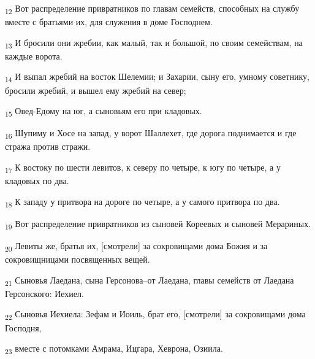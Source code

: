 \begin{tcolorbox}
\textsubscript{12} Вот распределение привратников по главам семейств, способных на службу вместе с братьями их, для служения в доме Господнем.
\end{tcolorbox}
\begin{tcolorbox}
\textsubscript{13} И бросили они жребии, как малый, так и большой, по своим семействам, на каждые ворота.
\end{tcolorbox}
\begin{tcolorbox}
\textsubscript{14} И выпал жребий на восток Шелемии; и Захарии, сыну его, умному советнику, бросили жребий, и вышел ему жребий на север;
\end{tcolorbox}
\begin{tcolorbox}
\textsubscript{15} Овед-Едому на юг, а сыновьям его при кладовых.
\end{tcolorbox}
\begin{tcolorbox}
\textsubscript{16} Шупиму и Хосе на запад, у ворот Шаллехет, где дорога поднимается и где стража против стражи.
\end{tcolorbox}
\begin{tcolorbox}
\textsubscript{17} К востоку по шести левитов, к северу по четыре, к югу по четыре, а у кладовых по два.
\end{tcolorbox}
\begin{tcolorbox}
\textsubscript{18} К западу у притвора на дороге по четыре, а у самого притвора по два.
\end{tcolorbox}
\begin{tcolorbox}
\textsubscript{19} Вот распределение привратников из сыновей Кореевых и сыновей Мерариных.
\end{tcolorbox}
\begin{tcolorbox}
\textsubscript{20} Левиты же, братья их, [смотрели] за сокровищами дома Божия и за сокровищницами посвященных вещей.
\end{tcolorbox}
\begin{tcolorbox}
\textsubscript{21} Сыновья Лаедана, сына Герсонова--от Лаедана, главы семейств от Лаедана Герсонского: Иехиел.
\end{tcolorbox}
\begin{tcolorbox}
\textsubscript{22} Сыновья Иехиела: Зефам и Иоиль, брат его, [смотрели] за сокровищами дома Господня,
\end{tcolorbox}
\begin{tcolorbox}
\textsubscript{23} вместе с потомками Амрама, Ицгара, Хеврона, Озиила.
\end{tcolorbox}
